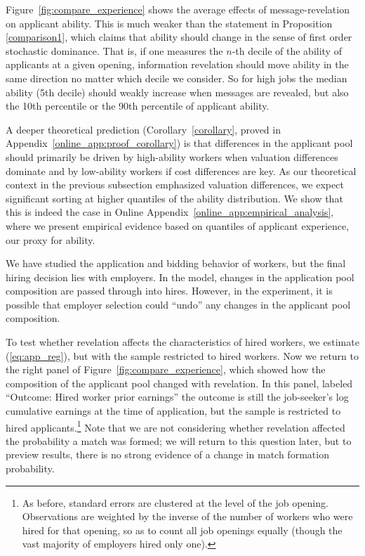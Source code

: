 \documentclass[12pt]{article}
\makeatletter
\renewcommand{\subsection}{%
  \@startsection{subsection}{2}{\z@}%
  {-3.25ex plus -1ex minus -.2ex}%
  {1.5ex plus .2ex}%
  {\normalfont\large\bfseries}%
}
\makeatother
\begin{document}

Figure~\ref{fig:compare_experience} shows the average effects of message-revelation on applicant ability. This is much weaker than the statement in Proposition \ref{comparison1}, which claims that ability should change in the sense of first order stochastic dominance. 
That is, if one measures the $n$-th decile of the ability of applicants at a given opening, information revelation should move ability in the same direction no matter which decile we consider. So for high jobs the median ability (5th decile) should weakly increase when messages are revealed, but also the 10th percentile or the 90th percentile of applicant ability. 

A deeper theoretical prediction (Corollary~\ref{corollary}, proved in Appendix~\ref{online_app:proof_corollary}) is that differences in the applicant pool should primarily be driven by high-ability workers when valuation differences dominate and by low-ability workers if cost differences are key. 
As our theoretical context in the previous subsection emphasized valuation differences, we expect significant sorting at higher quantiles of the ability distribution. 
We show that this is indeed the case in Online Appendix~\ref{online_app:empirical_analysis}, where we present empirical evidence based on quantiles of applicant experience, our proxy for ability.


We have studied the application and bidding behavior of workers, but the final hiring decision lies with employers.
In the model, changes in the application pool composition are passed through into hires.
However, in the experiment, it is possible that employer selection could ``undo'' any changes in the applicant pool composition. 

To test whether revelation affects the characteristics of hired workers, we estimate (\ref{eq:app_reg}), but with the sample restricted to hired workers.
Now we return to the right panel of Figure~\ref{fig:compare_experience}, which showed how the composition of the applicant pool changed with revelation.
In this panel, labeled ``Outcome: Hired worker prior earnings''  the outcome is still the job-seeker's log cumulative earnings at the time of application, but the sample is restricted to hired applicants.\footnote{
As before, standard errors are clustered at the level of the job opening.
Observations are weighted by the inverse of the number of workers who were hired for that opening, so as to count all job openings equally (though the vast majority of employers hired only one).}
Note that we are not considering whether revelation affected the probability a match was formed; we will return to this question later, but to preview results, there is no strong evidence of a change in match formation probability. 
\end{document}
